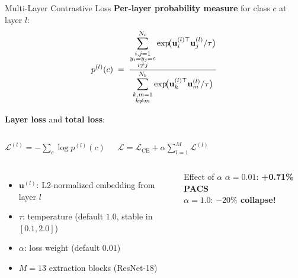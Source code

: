 \documentclass[aspectratio=169,10pt]{beamer}
\newcommand{\highlight}[1]{\textcolor{AccentOrange}{\textbf{#1}}}
\newcommand{\good}[1]{\textcolor{GreenOK}{\textbf{#1}}}
\begin{document}
\begin{frame}{Multi-Layer Contrastive Loss}
  \textbf{Per-layer probability measure} for class $c$ at layer $l$:
  \begin{equation*}
    p^{(l)}(c) \;=\;
    \frac{%
      \displaystyle\sum_{\substack{i,j=1\\y_i=y_j=c\\i\neq j}}^{N_c}
        \exp\!\bigl(\mathbf{u}_i^{(l)\top}\mathbf{u}_j^{(l)}/\tau\bigr)
    }{%
      \displaystyle\sum_{\substack{k,m=1\\k\neq m}}^{N_b}
        \exp\!\bigl(\mathbf{u}_k^{(l)\top}\mathbf{u}_m^{(l)}/\tau\bigr)
    }
  \end{equation*}

  \vspace{0.5em}
  \textbf{Layer loss} and \textbf{total loss}:
  \begin{columns}
      \begin{alertblock}{}
        \centering
        $\mathcal{L}^{(l)} = -\displaystyle\sum_c \log p^{(l)}(c)$
      \end{alertblock}

      \begin{alertblock}{}
        \centering
        $\mathcal{L} = \mathcal{L}_{\text{CE}} + \alpha\displaystyle\sum_{l=1}^{M}\mathcal{L}^{(l)}$
      \end{alertblock}
  \end{columns}

  \vspace{0.6em}
  \begin{columns}
      \begin{itemize}
        \item $\mathbf{u}^{(l)}$: L2-normalized embedding from layer $l$
        \item $\tau$: temperature (default $1.0$, stable in $[0.1, 2.0]$)
        \item $\alpha$: loss weight (default $0.01$)
        \item $M = 13$ extraction blocks (ResNet-18)
      \end{itemize}
      \begin{exampleblock}{\small Effect of $\alpha$}
        \scriptsize
        $\alpha{=}0.01$: \good{+0.71\% PACS}\\
        $\alpha{=}1.0$: \highlight{$-20\%$ collapse!}
      \end{exampleblock}
  \end{columns}
\end{frame}
\end{document}
